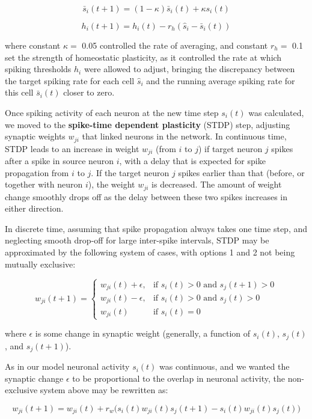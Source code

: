 \documentclass{article}
\begin{document}
\[ \bar{s}_i(t+1) = (1-\kappa)\bar{s}_i(t) + \kappa s_i(t) \]

\[ h_i(t+1) = h_i(t) - r_h(\hat{s}_i - \bar{s}_i(t)) \]

where constant $\kappa=$ 0.05 controlled the rate of averaging, and constant $r_h=$ 0.1 set the strength of homeostatic plasticity, as it controlled the rate at which spiking thresholds $h_i$ were allowed to adjust, bringing the discrepancy between the target spiking rate for each cell $\hat{s}_i$ and the running average spiking rate for this cell $\bar{s}_i(t)$ closer to zero.

Once spiking activity of each neuron at the new time step $s_i(t)$ was calculated, we moved to the \textbf{spike-time dependent plasticity} (STDP) step, adjusting synaptic weights $w_{ji}$ that linked neurons in the network. In continuous time, STDP leads to an increase in weight $w_{ji}$ (from $i$ to $j$) if target neuron $j$ spikes after a spike in source neuron $i$, with a delay that is expected for spike  propagation from $i$ to $j$. If the target neuron $j$ spikes earlier than that (before, or together with neuron $i$), the weight $w_{ji}$ is decreased. The amount of weight change smoothly drops off as the delay between these two spikes increases in either direction. 

In discrete time, assuming that spike propagation always takes one time step, and neglecting smooth drop-off for large inter-spike intervals, STDP may be approximated by the following system of cases, with options 1 and 2 not being mutually exclusive:

\[ w_{ji}(t+1) = \left \{ \begin{array}{lll} w_{ji}(t)+\epsilon, & \text{if } s_i(t)> 0 \text{ and } s_j(t+1)> 0 \\ w_{ji}(t)-\epsilon, & \text{if } s_i(t)> 0 \text{ and } s_j(t)> 0 \\ w_{ji}(t) & \text{if } s_i(t)=0\end{array} \right. \]

where $\epsilon$ is some change in synaptic weight (generally, a function of $s_i(t)$, $s_j(t)$, and $s_j(t+1)$). 

As in our model neuronal activity $s_i(t)$ was continuous, and we wanted the synaptic change $\epsilon$ to be proportional to the overlap in neuronal activity, the non-exclusive system above may be rewritten as:

\[ w_{ji}(t+1) = w_{ji}(t) + r_w \big(s_i(t)w_{ji}(t)s_j(t+1) - s_i(t)w_{ji}(t)s_j(t)\big) \]
\end{document}
